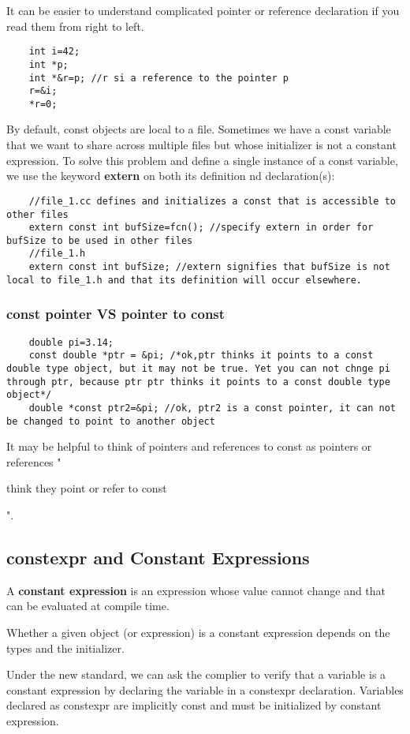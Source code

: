\documentclass[UTF8]{ctexart}
\newcommand \qd[1] {\begin{qds} {#1} \end{qds}}
\begin{document}
It can be easier to understand complicated pointer or reference declaration if you read them from right to left.
\begin{lstlisting}
	int i=42;
	int *p;
	int *&r=p; //r si a reference to the pointer p
	r=&i;
	*r=0;
\end{lstlisting}

By default, const objects are local to a file. Sometimes we have a const variable that we want to share across multiple files but whose initializer is not a constant expression. To solve this problem and define a single instance of a const variable, we use the keyword \textbf{extern} on both its definition nd declaration(s):
\begin{lstlisting}
	//file_1.cc defines and initializes a const that is accessible to other files
	extern const int bufSize=fcn(); //specify extern in order for bufSize to be used in other files
	//file_1.h
	extern const int bufSize; //extern signifies that bufSize is not local to file_1.h and that its definition will occur elsewhere.
\end{lstlisting}

\subsubsection{const pointer VS pointer to const}
\begin{lstlisting}
	double pi=3.14;
	const double *ptr = &pi; /*ok,ptr thinks it points to a const double type object, but it may not be true. Yet you can not chnge pi through ptr, because ptr ptr thinks it points to a const double type object*/
	double *const ptr2=&pi; //ok, ptr2 is a const pointer, it can not be changed to point to another object
\end{lstlisting}

It may be helpful to think of pointers and references to const as pointers or references "\qd{think they point or refer to const}".

\subsection{constexpr and Constant Expressions}
A \textbf{constant expression} is an expression whose value cannot change and that can be evaluated at compile time.

Whether a given object (or expression) is a constant expression depends on the types and the initializer.

Under the new standard, we can ask the complier to verify that a variable is a constant expression by declaring the variable in a constexpr declaration. Variables declared as constexpr are implicitly const and must be initialized by constant expression.
\end{document}
